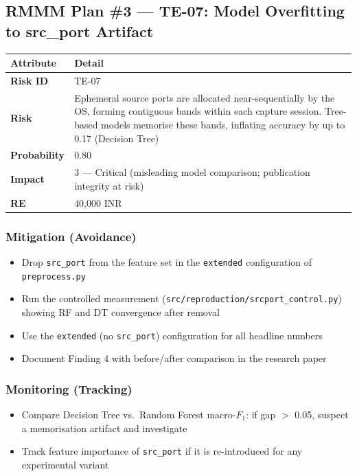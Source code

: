 \documentclass[11pt, a4paper]{article}
\newcommand{\col}[1]{\texttt{\small #1}}
\begin{document}
\subsection{RMMM Plan \#3 --- TE-07: Model Overfitting to src\_port Artifact}

\begin{center}
\small
\begin{tabular}{|l|p{10cm}|}
\hline
\rowcolor{orange!10}
\textbf{Attribute} & \textbf{Detail} \\
\hline
\textbf{Risk ID} & TE-07 \\
\hline
\textbf{Risk} & Ephemeral source ports are allocated near-sequentially by the OS, forming contiguous bands within each capture session. Tree-based models memorise these bands, inflating accuracy by up to 0.17 (Decision Tree) \\
\hline
\textbf{Probability} & 0.80 \\
\hline
\textbf{Impact} & 3 --- Critical (misleading model comparison; publication integrity at risk) \\
\hline
\textbf{RE} & 40,000 INR \\
\hline
\end{tabular}
\normalsize
\end{center}

\subsubsection*{Mitigation (Avoidance)}
\begin{itemize}[leftmargin=*]
    \item Drop \col{src\_port} from the feature set in the \col{extended} configuration of \col{preprocess.py}
    \item Run the controlled measurement (\col{src/reproduction/srcport\_control.py}) showing RF and DT convergence after removal
    \item Use the \col{extended} (no \col{src\_port}) configuration for all headline numbers
    \item Document Finding 4 with before/after comparison in the research paper
\end{itemize}

\subsubsection*{Monitoring (Tracking)}
\begin{itemize}[leftmargin=*]
    \item Compare Decision Tree vs.\ Random Forest macro-$F_1$: if gap $>$ 0.05, suspect a memorisation artifact and investigate
    \item Track feature importance of \col{src\_port} if it is re-introduced for any experimental variant
\end{itemize}
\end{document}
